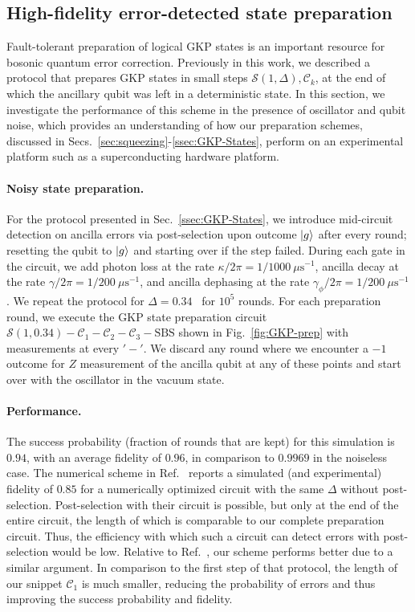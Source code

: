 \documentclass[aps,prx,showpacs,notitlepage,twocolumn,superscriptaddress,nofootinbib,preprintnumbers,floatfix,10pt, longbibliography]{revtex4-2}
\begin{document}
\subsection{High-fidelity error-detected state preparation}\label{ssec:GKP-errors}
Fault-tolerant preparation of logical GKP states is an important resource for bosonic quantum error correction. Previously in this work, we described a protocol that prepares GKP states in small steps $\mathcal{S}(1,\Delta),\mathcal{C}_k$, at the end of which the ancillary qubit was left in a deterministic state. In this section, we investigate the performance of this scheme in the presence of oscillator and qubit noise, which provides an understanding of how our preparation schemes, discussed in Secs.~\ref{sec:squeezing}-\ref{ssec:GKP-States}, perform on an experimental platform such as a superconducting hardware platform. 

\paragraph{Noisy state preparation.} For the protocol presented in Sec.~\ref{ssec:GKP-States}, we introduce mid-circuit detection on ancilla errors via post-selection upon outcome $\ket{g}$ after every round; resetting the qubit to $\ket{g}$ and starting over if the step failed. During each gate in the circuit, we add photon loss at the rate $\kappa/2\pi=1/1000 \ \mu\textrm{s}^{-1}$, ancilla decay at the rate $\gamma/2\pi=1/200 \ \mu\textrm{s}^{-1}$, and ancilla dephasing at the rate $\gamma_\phi/2\pi=1/200 \ \mu\textrm{s}^{-1}$. We repeat the protocol for $\Delta=0.34$~\cite{sivak2023real} for $10^5$ rounds. For each preparation round, we execute the GKP state preparation circuit $\mathcal{S}(1,0.34)-\mathcal{C}_1-\mathcal{C}_2-\mathcal{C}_3-\mathrm{SBS}$ shown in Fig.~\ref{fig:GKP-prep} with measurements at every $'-'$. We discard any round where we encounter a $-1$ outcome for $Z$ measurement of the ancilla qubit at any of these points and start over with the oscillator in the vacuum state. 

\paragraph{Performance.} The success probability (fraction of rounds that are kept) for this simulation is $0.94$, with an average fidelity of $0.96$, in comparison to $0.9969$ in the noiseless case. The numerical scheme in Ref.~\cite{eickbusch2022fast} reports a simulated (and experimental) fidelity of $0.85$ for a numerically optimized circuit with the same $\Delta$ without post-selection. Post-selection with their circuit is possible, but only at the end of the entire circuit, the length of which is comparable to our complete preparation circuit. Thus, the efficiency with which such a circuit can detect errors with post-selection would be low. Relative to Ref.~\cite{hastrup2021improved}, our scheme performs better due to a similar argument. In comparison to the first step of that protocol, the length of our snippet $\mathcal{C}_1$ is much smaller, reducing the probability of errors and thus improving the success probability and fidelity.
\end{document}
